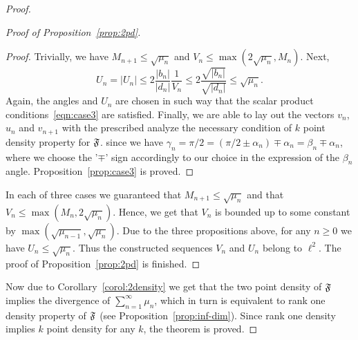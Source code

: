 \begin{proof}
\begin{proof}[Proof of Proposition~\ref{prop:2pd}]
\begin{proof}
            Trivially, we have $M_{n+1} \leq \sqrt{\mu_n}$ and $V_n \leq \max(2\sqrt{\mu_n}, M_n)$.
            Next,
            \[
              U_n = |U_n| \leq 2 \frac{|b_n|}{|d_n|} \frac{1}{V_n} \leq 2 \frac{\sqrt{|b_n|}}{\sqrt{|d_n|}} \leq \sqrt{\mu_n}.
            \]
            Again, the angles and $U_n$ are chosen in such way that the scalar product conditions~\eqref{eqn:case3} are satisfied.
            Finally, we are able to lay out the vectors $v_n$, $u_n$ and $v_{n+1}$ with the prescribed  analyze the necessary condition of $k$ point density property for $\mathfrak{F}$.
              since we have $\gamma_n = \pi/2 = (\pi/2 \pm \alpha_n) \mp \alpha_n = \beta_n \mp \alpha_n$,
              where we choose the '$\mp$' sign accordingly to our choice in the expression of the $\beta_n$ angle.
            Proposition~\ref{prop:case3} is proved.
          \end{proof}
        In each of three cases we guaranteed that $M_{n+1} \leq \sqrt{\mu_n}$ and that $V_n \leq \max(M_n, 2\sqrt{\mu_n})$.
        Hence, we get that $V_n$ is bounded up to some constant by $\max(\sqrt{\mu_{n-1}}, \sqrt{\mu_n})$.
        Due to the three propositions above, for any $n \geq 0$ we have $U_n \leq \sqrt{\mu_n}$.
        Thus the constructed sequences $V_n$ and $U_n$ belong to $\ell^2$.
        The proof of Proposition~\ref{prop:2pd} is finished.
      \end{proof}
      Now due to Corollary~\ref{corol:2density} we get that the two point density of $\mathfrak{F}$ implies the divergence of $\sum_{n=1}^\infty \mu_n$,
        which in turn is equivalent to rank one density property of $\mathfrak{F}$ (see Proposition~\ref{prop:inf-dim}).
      Since rank one density implies $k$ point density for any $k$, the theorem is proved.
    \end{proof}
